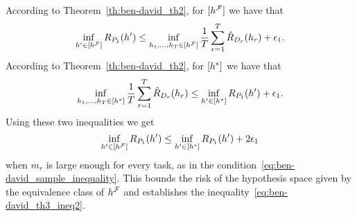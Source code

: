 According to Theorem~\ref{th:ben-david_th2}, for $\lbrack h^{\mathcal{F}}\rbrack$ we have that
\begin{equation}
    \nonumber
    {\inf_{h' \in \lbrack h^{\mathcal{F}}\rbrack}R_{P_1}(h')} \leq \inf_{h_1, \ldots, h_T \in \lbrack h^{\mathcal{F}}\rbrack} \frac{1}{T} \sum_{r=1}^T \hat{R}_{D_r}(h_r)  + \epsilon_1.
\end{equation}
According to Theorem~\ref{th:ben-david_th2}, for $\lbrack h^*\rbrack$ we have that
\begin{equation}
    \nonumber
    {\inf_{h_1, \ldots, h_T\in \lbrack h^*\rbrack} \frac{1}{T} \sum_{r=1}^T\hat{R}_{D_r}(h_r) \leq \inf_{h' \in \lbrack h^*\rbrack}R_{P_1}(h')}  + \epsilon_1.
\end{equation}
Using these two inequalities we get
\begin{equation}
    \nonumber
    \inf_{h' \in \lbrack h^{\mathcal{F}}\rbrack}R_{P_1}(h') \leq \inf_{h' \in \lbrack h^*\rbrack}R_{P_1}(h') + 2\epsilon_1 
\end{equation}
when $m_r$ is large enough for every task, as in the condition~\eqref{eq:ben-david_sample_inequality}. This bounds the risk of the hypothesis space given by the equivalence class of $h^{\mathcal{F}}$ and establishes the inequality~\eqref{eq:ben-david_th3_ineq2}.
%

